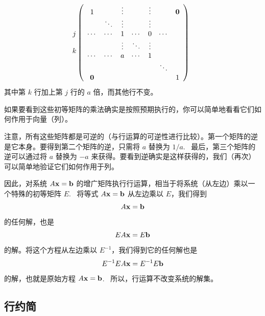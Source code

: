 \[
\begin{array}{@{}c@{\,}c}
    \begin{array}{@{}c@{}} \\ j \\ \\ k \\ \\ \end{array}
    &
    \left(
    \begin{array}{ccccccc}
        1      &          & \vdots   &        & \vdots   &        & \oo \\
               & \ddots   & \vdots   &        & \vdots   &        &            \\
        \cdots & \cdots   & 1        & \cdots & 0        & \cdots &            \\
               &          & \vdots   & \ddots & \vdots   &        &            \\
        \cdots & \cdots   & a        & \cdots & 1        &        &            \\
               &          &          &        &          & \ddots &            \\
        \oo &        &          &        &        &        & 1
    \end{array}
    \right)
\end{array}
\]
其中第 $k$ 行加上第 $j$ 行的 $a$ 倍，而其他行不变。

如果要看到这些初等矩阵的乘法确实是按照预期执行的，你可以简单地看看它们如何作用于向量（列）。

注意，所有这些矩阵都是可逆的（与行运算的可逆性进行比较）。第一个矩阵的逆是它本身。要得到第二个矩阵的逆，只需将 $a$ 替换为 $1/a$. ~最后，第三个矩阵的逆可以通过将 $a$ 替换为 $-a$ 来获得。要看到逆确实是这样获得的，我们（再次）可以简单地验证它们如何作用于列。

因此，对系统 $A \mathbf{x} = \mathbf{b}$ 的增广矩阵执行行运算，相当于将系统（从左边）乘以一个特殊的初等矩阵 $E$. ~将等式 $A \mathbf{x} = \mathbf{b}$ 从左边乘以 $E$，我们得到 $$A \mathbf{x} = \mathbf{b}$$
的任何解，也是 $$EA \mathbf{x} = E \mathbf{b}$$
的解。将这个方程从左边乘以 $E^{-1}$，我们得到它的任何解也是 $$E^{-1} EA \mathbf{x} = E^{-1} E \mathbf{b}$$
的解，也就是原始方程 $A \mathbf{x} = \mathbf{b}$. ~所以，行运算不改变系统的解集。

\subsection{行约简}\label{sec:02-02-02}

